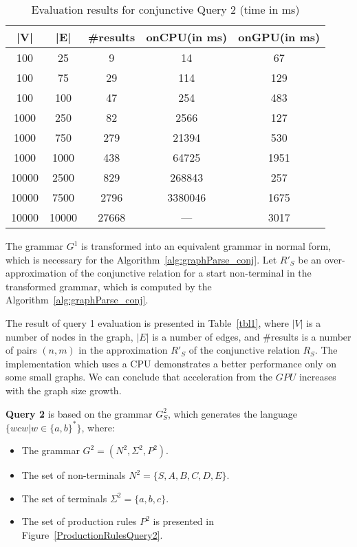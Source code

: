 \begin{table*}[h]
    \centering
    \caption{Evaluation results for conjunctive Query 2 (time in ms)}
    \label{tbl2}
    
    \begin{tabular}{ | c | c | c | c | c |}
        \hline
        |V| & |E| & \#results & onCPU(in ms) & onGPU(in ms) \\
        \hline 
        \hline
        100 & 25 & 9 & 14 & 67\\
        100 & 75 & 29 & 114 & 129\\
        100 & 100 & 47 & 254 & 483\\
        1000  & 250 & 82 & 2566 & 127\\
        1000 & 750 & 279 & 21394 & 530\\
        1000 & 1000 & 438 & 64725 & 1951\\
        10000 & 2500 & 829 & 268843 & 257\\
        10000 & 7500 & 2796 & 3380046 & 1675\\
        10000 & 10000 & 27668 & --- & 3017\\
        \hline
    \end{tabular}
    
\end{table*}


The grammar $G^1$ is transformed into an equivalent grammar in normal form, which is necessary for the Algorithm~\ref{alg:graphParse_conj}. Let $R'_S$ be an over-approximation of the conjunctive relation for a start non-terminal in the transformed grammar, which is computed by the Algorithm~\ref{alg:graphParse_conj}.

The result of query 1 evaluation is presented in Table~\ref{tbl1}, where $|V|$ is a number of nodes in the graph, $|E|$ is a number of edges, and \#results is a number of pairs $(n,m)$ in the approximation $R'_S$ of the conjunctive relation $R_S$. The implementation which uses a CPU demonstrates a better performance only on some small graphs. We can conclude that acceleration from the $GPU$ increases with the graph size growth.

\textbf{Query 2} is based on the grammar $G^2_S$, which generates the language $\{wcw | w \in \{a,b\}^*\}$, where:
\begin{itemize}
    \item The grammar $G^2 = (N^2, \Sigma^2, P^2)$.
    \item The set of non-terminals $N^2 = \{S, A, B, C, D, E\}$.
    \item The set of terminals $\Sigma^2 = \{a, b, c\}.$
    \item The set of production rules $P^2$ is presented in Figure~\ref{ProductionRulesQuery2}.
\end{itemize}

